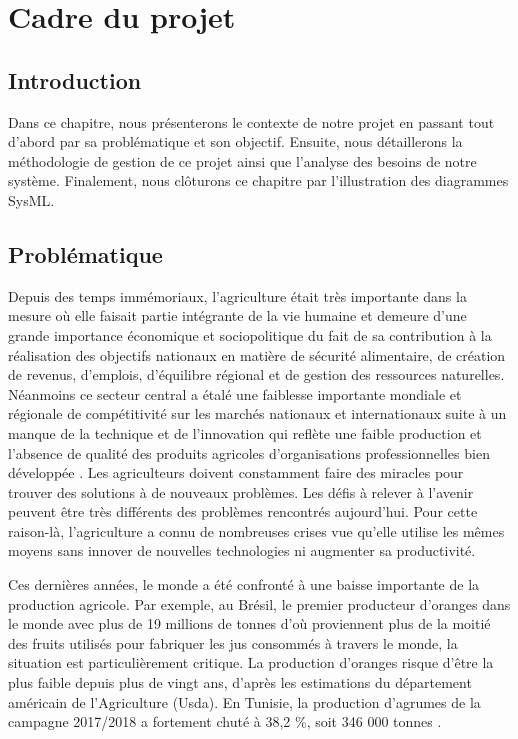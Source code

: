 

	\chapter{Cadre du projet }
	\newpage
	
	
	\section{Introduction }
	Dans ce chapitre, nous présenterons le contexte de notre projet en passant tout d'abord par sa  problématique et son objectif. Ensuite, nous détaillerons la méthodologie de gestion de ce projet ainsi que l'analyse des besoins de notre système. Finalement, nous clôturons ce chapitre par l'illustration des diagrammes SysML.
	
	\section{Problématique }
	Depuis des temps immémoriaux, l'agriculture était très importante dans la mesure où elle faisait partie intégrante de la vie humaine et demeure d'une grande importance économique et sociopolitique du fait de sa contribution à la réalisation des objectifs nationaux en matière de sécurité alimentaire, de création de revenus, d'emplois, d'équilibre régional et de gestion des ressources naturelles. Néanmoins ce secteur central a étalé une faiblesse importante mondiale et régionale de compétitivité sur les marchés nationaux et internationaux suite à un manque de la technique et de l'innovation qui reflète une faible production et l'absence de qualité des produits agricoles d'organisations professionnelles bien développée . Les agriculteurs doivent constamment faire des miracles pour trouver des solutions à de nouveaux problèmes. Les défis à relever à l'avenir peuvent être très différents des problèmes rencontrés aujourd'hui. Pour cette raison-là, l'agriculture a connu de nombreuses crises vue qu'elle utilise les mêmes moyens sans innover de nouvelles technologies ni augmenter sa productivité.
	
	Ces dernières années, le monde a été confronté à une baisse importante de la production agricole. Par exemple, au Brésil, le premier producteur d'oranges dans le monde avec plus de 19 millions de tonnes d'où proviennent plus de la moitié des fruits utilisés pour fabriquer les jus consommés à travers le monde, la situation est particulièrement critique. La production d'oranges risque d'être la plus faible depuis plus de vingt ans, d'après les estimations du département américain de l'Agriculture (Usda). En Tunisie, la production d'agrumes de la campagne 2017/2018 a fortement chuté à 38,2 \%, soit 346 000 tonnes \cite{onagri2017/2018}.
	
